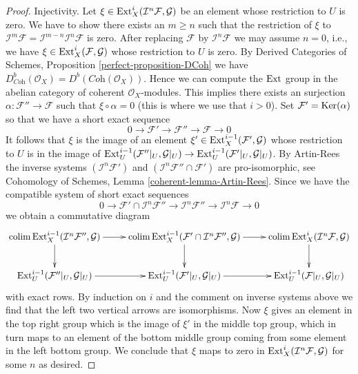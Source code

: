\begin{proof}
\medskip\noindent
Injectivity. Let $\xi \in \mathop{\mathrm{Ext}}\nolimits^i_X(\mathcal{I}^n\mathcal{F}, \mathcal{G})$
be an element whose restriction to $U$ is zero. We have to show there exists
an $m \geq n$ such that the restriction of $\xi$ to
$\mathcal{I}^m\mathcal{F} = \mathcal{I}^{m - n}\mathcal{I}^n\mathcal{F}$
is zero. After replacing $\mathcal{F}$ by $\mathcal{I}^n\mathcal{F}$
we may assume $n = 0$, i.e., we have
$\xi \in \mathop{\mathrm{Ext}}\nolimits^i_X(\mathcal{F}, \mathcal{G})$
whose restriction to $U$ is zero. By
Derived Categories of Schemes, Proposition \ref{perfect-proposition-DCoh}
we have
$D^b_{\textit{Coh}}(\mathcal{O}_X) = D^b(\textit{Coh}(\mathcal{O}_X))$.
Hence we can compute the $\mathop{\mathrm{Ext}}\nolimits$ group in the abelian category of
coherent $\mathcal{O}_X$-modules. This implies there exists an
surjection $\alpha : \mathcal{F}'' \to \mathcal{F}$ such that
$\xi \circ \alpha = 0$ (this is where we use that $i > 0$).
Set $\mathcal{F}' = \mathop{\mathrm{Ker}}(\alpha)$ so that we have a short exact
sequence
$$
0 \to \mathcal{F}' \to \mathcal{F}'' \to \mathcal{F} \to 0
$$
It follows that $\xi$ is the image of an element
$\xi' \in \mathop{\mathrm{Ext}}\nolimits^{i - 1}_X(\mathcal{F}', \mathcal{G})$
whose restriction to $U$ is in the image of
$\mathop{\mathrm{Ext}}\nolimits^{i - 1}_U(\mathcal{F}''|_U, \mathcal{G}|_U) \to
\mathop{\mathrm{Ext}}\nolimits^{i - 1}_U(\mathcal{F}'|_U, \mathcal{G}|_U)$.
By Artin-Rees the inverse systems $(\mathcal{I}^n\mathcal{F}')$ and
$(\mathcal{I}^n \mathcal{F}'' \cap \mathcal{F}')$ are pro-isomorphic, see
Cohomology of Schemes, Lemma \ref{coherent-lemma-Artin-Rees}.
Since we have the compatible system of short exact sequences
$$
0 \to
\mathcal{F}' \cap \mathcal{I}^n\mathcal{F}'' \to
\mathcal{I}^n\mathcal{F}'' \to
\mathcal{I}^n\mathcal{F} \to 0
$$
we obtain a commutative diagram
$$
\xymatrix{
\colim \Ext^{i - 1}_X(\mathcal{I}^n\mathcal{F}'', \mathcal{G})
\ar[r] \ar[d] &
\colim \Ext^{i - 1}_X(\mathcal{F}' \cap \mathcal{I}^n\mathcal{F}'', \mathcal{G})
\ar[r] \ar[d] &
\colim \Ext^i_X(\mathcal{I}^n\mathcal{F}, \mathcal{G})
\ar[d] \\
\Ext^{i - 1}_U(\mathcal{F}''|_U, \mathcal{G}|_U) \ar[r] &
\Ext^{i - 1}_U(\mathcal{F}'|_U, \mathcal{G}|_U) \ar[r] &
\Ext^{i - 1}_U(\mathcal{F}|_U, \mathcal{G}|_U)
}
$$
with exact rows. By induction on $i$ and the comment on inverse systems above
we find that the left two vertical arrows are isomorphisms.
Now $\xi$ gives an element in the top right group which is the image
of $\xi'$ in the middle top group, which in turn maps to an element of
the bottom middle group coming from some element in the left bottom group.
We conclude that $\xi$ maps to zero in
$\mathop{\mathrm{Ext}}\nolimits^i_X(\mathcal{I}^n\mathcal{F}, \mathcal{G})$
for some $n$ as desired.


\end{proof}
